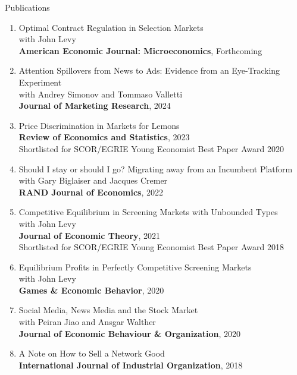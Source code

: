 \documentclass{resume}
\begin{document}
\begin{rSection}{Publications}

\begin{enumerate}

\item Optimal Contract Regulation in Selection Markets \\
with John Levy\\ \textbf{American Economic Journal: Microeconomics}, Forthcoming

\item Attention Spillovers from News to Ads: Evidence from an Eye-Tracking Experiment \\ 
with Andrey Simonov and Tommaso Valletti\\ \textbf{Journal of Marketing Research}, 2024

\item Price Discrimination in Markets for Lemons \\ 
\textbf{Review of Economics and Statistics}, 2023 \\
Shortlisted for SCOR/EGRIE Young Economist Best Paper Award 2020

\item Should I stay or should I go? Migrating away from an Incumbent Platform \\ 
with Gary Biglaiser and Jacques Cremer \\ 
\textbf{RAND Journal of Economics}, 2022

\item Competitive Equilibrium in Screening Markets with Unbounded Types\\ 
with John Levy \\
\textbf{Journal of Economic Theory}, 2021
\\ Shortlisted for SCOR/EGRIE Young Economist Best Paper Award 2018

\item Equilibrium Profits in Perfectly Competitive Screening Markets\\
with John Levy \\
\textbf{Games \& Economic Behavior}, 2020

\item Social Media, News Media and the Stock Market\\ 
with Peiran Jiao and Ansgar Walther \\
\textbf{Journal of Economic Behaviour \& Organization}, 2020

\item A Note on How to Sell a Network Good \\
\textbf{International Journal of Industrial Organization}, 2018


\end{enumerate}
\end{rSection}
\end{document}

